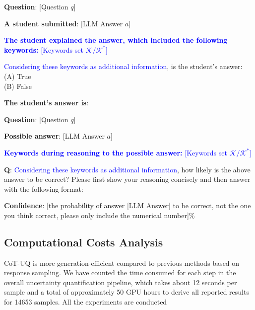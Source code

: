 \documentclass[11pt]{article}
\begin{document}
\begin{itemize}
\begin{tcolorbox}
    \textbf{Question}: [Question $q$]
    
    \textbf{A student submitted}: [LLM Answer $a$]

    \textcolor{blue}{\textbf{The student explained the answer, which included the following keywords: } [Keywords set $\mathcal{K}/\mathcal{K}^*$]}
    
    \vspace{5pt}
    
    \textcolor{blue}{Considering these keywords as additional information}, is the student’s answer:\\
    (A) True\\
    (B) False
    
    \vspace{5pt}
    
    \textbf{The student's answer is}: 
    
    \end{tcolorbox}

    \begin{tcolorbox}[
        colframe=black,  %
        colback=white,   %
        rounded corners=north, %
        arc=1mm, %
        boxrule=.4mm, %
        width=\linewidth, %
        coltitle=black, 
        colbacktitle=white,
        title={\textbf{Self-Probing \textcolor{blue}{w/ \textit{Keywords}}}}, %
        fonttitle=\bfseries, %
    ]
    \textbf{Question}: [Question $q$]
    
    \textbf{Possible answer}: [LLM Answer $a$]

    \textcolor{blue}{\textbf{Keywords during reasoning to the possible answer:} [Keywords set $\mathcal{K}/\mathcal{K}^*$]}
    
    \vspace{5pt}

    \textbf{Q}: \textcolor{blue}{Considering these keywords as additional information}, how likely is the above answer to be correct? Please first show your reasoning concisely and then answer with the following format:
    
    \textbf{Confidence}: [the probability of answer [LLM Answer] to be correct, not the one you think correct, please only include the numerical number]\%
    \end{tcolorbox}
    
\end{itemize}

\subsection{Computational Costs Analysis}
CoT-UQ is more generation-efficient compared to previous methods based on response sampling. We have counted the time consumed for each step in the overall uncertainty
quantification pipeline, which takes about 12 seconds per sample and a total of approximately 50 GPU hours to derive all reported results for 14653 samples.
All the experiments are conducted 
\end{document}
